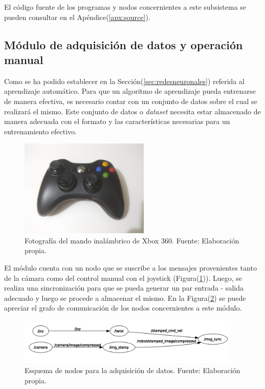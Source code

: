 El código fuente de los programas y nodos concernientes a este subsistema se pueden consultar en el Apéndice(\ref{apx:source}).

    \subsection{Módulo de adquisición de datos y operación manual}
    Como se ha podido establecer en la Sección(\ref{sec:redesneuronales}) referida al aprendizaje automático. Para que un algoritmo de aprendizaje pueda 
    entrenarse de manera efectiva, es necesario contar con un conjunto de datos sobre el cual se realizará el mismo. Este conjunto 
    de datos o \textit{dataset} necesita estar almacenado de manera adecuada con el formato y las características necesarias para 
    un entrenamiento efectivo.
    
    \begin{figure}[!h] 
        \centering
        \includegraphics[width=0.55\textwidth]{img/joystick}
        \caption[Fotografía del mando inalámbrico de Xbox 360]{Fotografía del mando inalámbrico de Xbox 360. Fuente: Elaboración propia. }
        \label{fig:joystick}
    \end{figure}

    El módulo cuenta con un nodo que se suscribe a los mensajes provenientes tanto de la cámara como del control manual con el 
    joystick (Figura(\ref{fig:joystick})). Luego, se realiza una sincronización para que se pueda generar un par entrada - salida 
    adecuado y luego se procede a almacenar el mismo. En la Figura(\ref{fig:nodosdaq}) se puede apreciar el grafo de comunicación de los 
    nodos concernientes a este módulo.


    
    \begin{figure}[!h] 
        \centering
        \includegraphics[width=0.95\textwidth]{img/nodosdaq}
        \caption[Esquema de nodos para la adquisición de datos]{Esquema de nodos para la adquisición de datos. Fuente: Elaboración propia. }
        \label{fig:nodosdaq}
    \end{figure}

